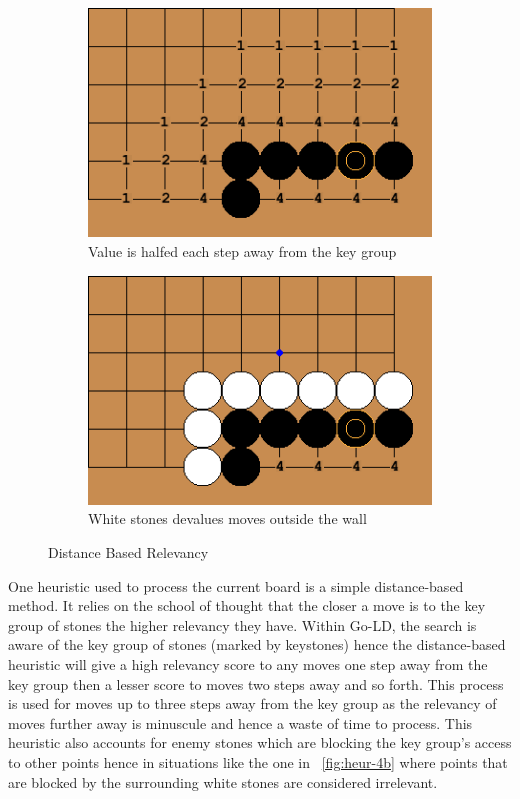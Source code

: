 \documentclass{l4proj}
\begin{document}
\begin{figure}[!ht]
\centering
\begin{subfigure}[b]{0.35\textwidth}
\centering
\includegraphics[width=\textwidth]{heur/4a.png}
\caption{Value is halfed each step away from the key group}
\label{fig:heur-4a}
\end{subfigure}\qquad
\begin{subfigure}[b]{0.35\textwidth}
\centering
\includegraphics[width=\textwidth]{heur/4b.png}
\caption{White stones devalues moves outside the wall}
\label{fig:heur-4b}
\end{subfigure}
\caption{Distance Based Relevancy}
\label{fig:heur-4}
\end{figure}

One heuristic used to process the current board is a simple distance-based method. It relies on the school of thought that the closer a move is to the key group of stones the higher relevancy they have. Within Go-LD, the search is aware of the key group of stones (marked by keystones) hence the distance-based heuristic will give a high relevancy score to any moves one step away from the key group then a lesser score to moves two steps away and so forth. This process is used for moves up to three steps away from the key group as the relevancy of moves further away is minuscule and hence a waste of time to process. This heuristic also accounts for enemy stones which are blocking the key group's access to other points hence in situations like the one in ~\autoref{fig:heur-4b} where points that are blocked by the surrounding white stones are considered irrelevant.
\end{document}
